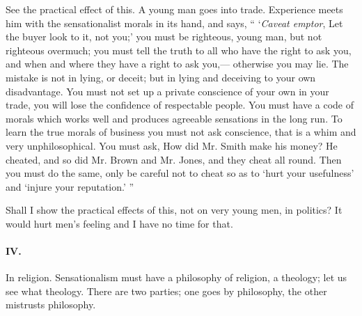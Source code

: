 \documentclass[12pt]{article}
\begin{document}
See the practical effect of this. A young man goes into trade. Experience meets him with the sensationalist morals in its hand, and says, {``} `\emph{Caveat emptor}, Let the buyer look to it, not you;' you must be righteous, young man, but not righteous overmuch; you must tell the truth to all who have the right to ask you, and when and where they have a right to ask you,--- otherwise you may lie. The mistake is not in lying, or deceit; but in lying and deceiving to your own disadvantage. You must not set up a private conscience of your own in your trade, you will lose the confidence of respectable people. You must have a code of morals which works well and produces agreeable sensations in the long run. To learn the true morals of business you must not ask conscience, that is a whim and very unphilosophical. You must ask, How did Mr. Smith make his money? He cheated, and so did Mr. Brown and Mr. Jones, and they cheat all round. Then you must do the same, only be careful not to cheat so as to `hurt your usefulness' and `injure your reputation.' {''} 

Shall I show the practical effects of this, not on very young men, in politics? It would hurt men's feeling and I have no time for that. 

\paragraph{IV.} In religion. Sensationalism must have a philosophy of religion, a theology; let us see what theology. There are two parties; one goes by philosophy, the other mistrusts philosophy. 
\end{document}
